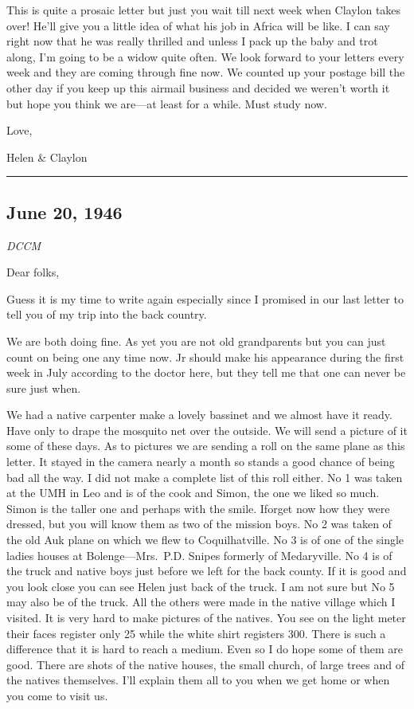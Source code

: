 \documentclass[
]{book}
\begin{document}
This is quite a prosaic letter but just you wait till next week when Claylon takes over! He'll give you a little idea of what his job in Africa will be like. I can say right now that he was really thrilled and unless I pack up the baby and trot along, I'm going to be a widow quite often. We look forward to your letters every week and they are coming through fine now. We counted up your postage bill the other day if you keep up this airmail business and decided we weren't worth it but hope you think we are---at least for a while. Must study now.

Love,

Helen \& Claylon

\begin{center}\rule{0.5\linewidth}{0.5pt}\end{center}

\hypertarget{june-20-1946}{%
\subsection{June 20, 1946}\label{june-20-1946}}

\emph{DCCM}

Dear folks,

Guess it is my time to write again especially since I promised in our last letter to tell you of my trip into the back country.

We are both doing fine. As yet you are not old grandparents but you can just count on being one any time now. Jr should make his appearance during the first week in July according to the doctor here, but they tell me that one can never be sure just when.

We had a native carpenter make a lovely bassinet and we almost have it ready. Have only to drape the mosquito net over the outside. We will send a picture of it some of these days. As to pictures we are sending a roll on the same plane as this letter. It stayed in the camera nearly a month so stands a good chance of being bad all the way. I did not make a complete list of this roll either. No 1 was taken at the UMH in Leo and is of the cook and Simon, the one we liked so much. Simon is the taller one and perhaps with the smile. Iforget now how they were dressed, but you will know them as two of the mission boys. No 2 was taken of the old Auk plane on which we flew to Coquilhatville. No 3 is of one of the single ladies houses at Bolenge---Mrs.~P.D. Snipes formerly of Medaryville. No 4 is of the truck and native boys just before we left for the back county. If it is good and you look close you can see Helen just back of the truck. I am not sure but No 5 may also be of the truck. All the others were made in the native village which I visited. It is very hard to make pictures of the natives. You see on the light meter their faces register only 25 while the white shirt registers 300. There is such a difference that it is hard to reach a medium. Even so I do hope some of them are good. There are shots of the native houses, the small church, of large trees and of the natives themselves. I'll explain them all to you when we get home or when you come to visit us.
\end{document}
